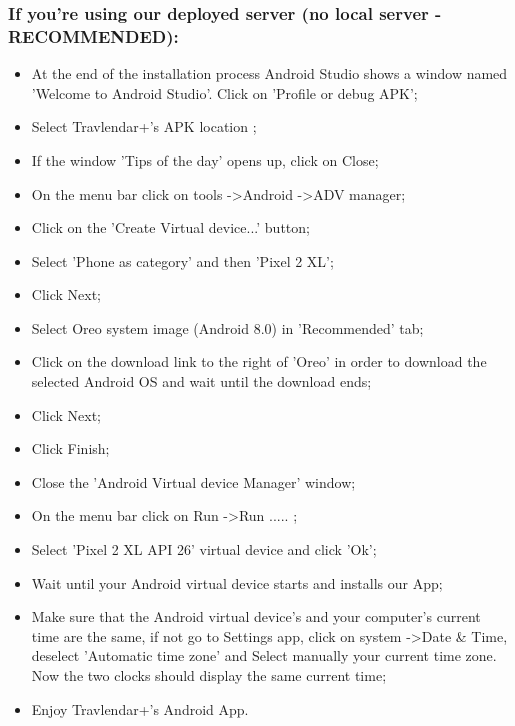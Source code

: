 \subsubsection{If you're using our deployed server (no local server - RECOMMENDED):}
\begin{itemize}
	\item At the end of the installation process Android Studio shows a window named 'Welcome to Android Studio'. Click on 'Profile or debug APK';
	\item Select Travlendar+'s APK location ;
	\item If the window 'Tips of the day' opens up, click on Close;
	\item On the menu bar click on tools -\textgreater Android -\textgreater ADV manager;
	\item Click on the 'Create Virtual device...' button;
	\item Select 'Phone as category' and then 'Pixel 2 XL';
	\item Click Next;
	\item Select Oreo system image (Android 8.0) in 'Recommended' tab;
	\item Click on the download link to the right of 'Oreo' in order to download the selected Android OS and wait until the download ends; 
	\item Click Next;
	\item Click Finish;
	\item Close the 'Android Virtual device Manager' window;
	\item On the menu bar click on Run -\textgreater Run ..... ;
	\item Select 'Pixel 2 XL API 26' virtual device and click 'Ok';
	\item Wait until your Android virtual device starts and installs our App;
	\item Make sure that the Android virtual device's and your computer's current time are the same, if not go to Settings app, click on system -\textgreater Date \& Time, deselect 'Automatic time zone' and Select manually your current time zone. Now the two clocks should display the same current time;
	\item Enjoy Travlendar+'s Android App.	
\end{itemize}

